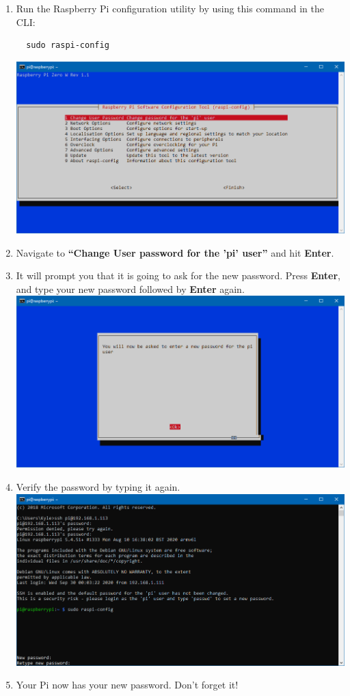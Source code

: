 \documentclass{article}
\begin{document}
\begin{enumerate}
  \item Run the Raspberry Pi configuration utility by using this command in the CLI:
  \begin{lstlisting}
  sudo raspi-config
  \end{lstlisting}
  \includegraphics[width=1.00\textwidth]{rcpw}
  \item Navigate to \textbf{``Change User password for the 'pi' user''} and hit \textbf{Enter}.
  \item It will prompt you that it is going to ask for the new password. Press \textbf{Enter}, and type your new password followed by \textbf{Enter} again.
  \newline
  \newline
  \includegraphics[width=1.00\textwidth]{rcpwconf}
  \item Verify the password by typing it again.
  \newline
  \newline
  \includegraphics[width=1.00\textwidth]{rcpwretype}
  \item Your Pi now has your new password. Don't forget it!
\end{enumerate}
\end{document}
